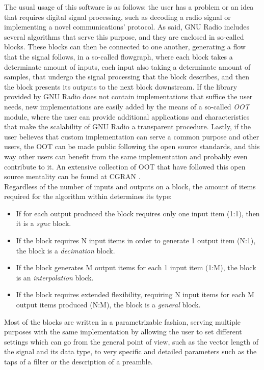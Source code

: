 The usual usage of this software is as follows: the user has a problem or an idea that requires digital signal processing, such as decoding a radio signal or implementing a novel communications' protocol. As said, GNU Radio includes several algorithms that serve this purpose, and they are enclosed in so-called blocks. These blocks can then be connected to one another, generating a flow that the signal follows, in a so-called flowgraph, where each block takes a determinate amount of inputs, each input also taking a determinate amount of samples, that undergo the signal processing that the block describes, and then the block presents its outputs to the next block downstream. If the library provided by GNU Radio does not contain implementations that suffice the user needs, new implementations are easily added by the means of a so-called \emph{\ac{OOT}} module, where the user can provide additional applications and characteristics that make the scalability of GNU Radio a transparent procedure. Lastly, if the user believes that custom implementation can serve a common purpose and other users, the \ac{OOT} can be made public following the open source standards, and this way other users can benefit from the same implementation and probably even contribute to it. An extensive collection of \ac{OOT} that have followed this open source mentality can be found at \ac{CGRAN} \cite{CGRAN}.\\

Regardless of the number of inputs and outputs on a block, the amount of items required for the algorithm within determines its type:

\begin{itemize}
    \item If for each output produced the block requires only one input item (1:1), then it is a \emph{sync} block.
    \item If the block requires N input items in order to generate 1 output item (N:1), the block is a \emph{decimation} block.
    \item If the block generates M output items for each 1 input item (1:M), the block is an \emph{interpolation} block.
    \item If the block requires extended flexibility, requiring N input items for each M output items produced (N:M), the block is a \emph{general} block.
\end{itemize}

Most of the blocks are written in a parametrizable fashion, serving multiple purposes with the same implementation by allowing the user to set different settings which can go from the general point of view, such as the vector length of the signal and its data type, to very specific and detailed parameters such as the taps of a filter or the description of a preamble. \\

